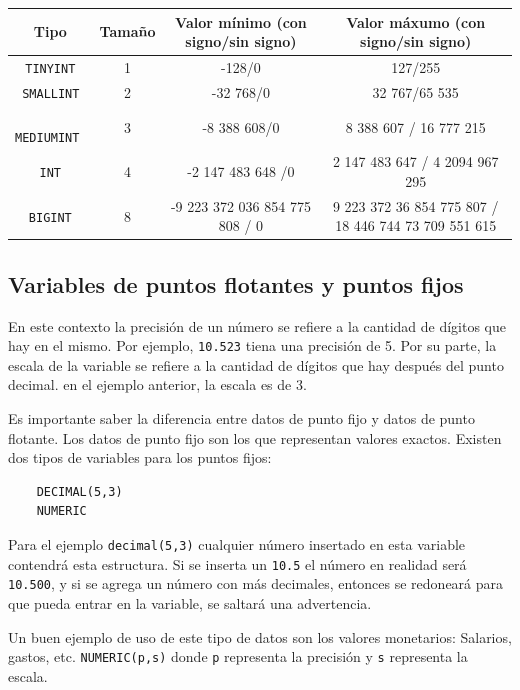     \begin{table}[H]
        \centering
        \begin{tabular}{c|c|c|c|}
        \hline
            Tipo & Tamaño & Valor mínimo (con signo/sin signo) & Valor máxumo (con signo/sin signo)  \\ \hline
            \texttt{ TINYINT }  & 1  & -128/0  & 127/255\\ \hline
            \texttt{ SMALLINT } & 2  &  -32 768/0 & 32 767/65 535\\ \hline
            \texttt{ MEDIUMINT }& 3  &  -8 388 608/0 & 8 388 607 / 16 777 215 \\ \hline
            \texttt{ INT }      & 4  & -2 147 483 648 /0  & 2 147 483 647 / 4 2094 967 295 \\ \hline
            \texttt{ BIGINT }   & 8  & -9 223 372 036 854 775 808 / 0 &  9 223 372 36 854 775 807 / 18 446 744 73 709 551 615\\ \hline
        \end{tabular}
    \end{table}

    \subsection{Variables de puntos flotantes y puntos fijos}

    En este contexto la precisión de un número se refiere a la cantidad de dígitos que hay en el mismo. Por ejemplo, \texttt{10.523} tiena una precisión de 5. Por su parte, la escala de la variable se refiere a la cantidad de dígitos que hay después del punto decimal. en el ejemplo anterior, la escala es de 3.

    Es importante saber la diferencia entre datos de punto fijo y datos de punto flotante. Los datos de punto fijo son los que representan valores exactos. Existen dos tipos de variables para los puntos fijos:

    \begin{verbatim}
    DECIMAL(5,3)
    NUMERIC
    \end{verbatim}
    Para el ejemplo \texttt{decimal(5,3)} cualquier número insertado en esta variable contendrá esta estructura. Si se inserta un \texttt{10.5} el número en realidad será \texttt{10.500}, y si se agrega un número con más decimales, entonces se redoneará para que pueda entrar en la variable, se saltará una advertencia.

    Un buen ejemplo de uso de este tipo de datos son los valores monetarios: Salarios, gastos, etc. \texttt{NUMERIC(p,s)} donde \texttt{p} representa la precisión y \texttt{s} representa la escala.


